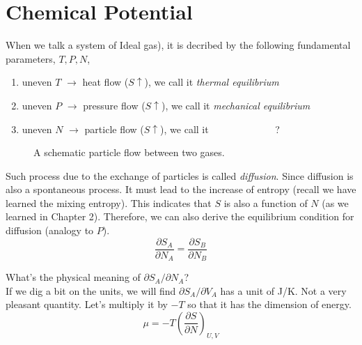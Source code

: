 \documentclass[twoside]{article}
\begin{document}
\section{Chemical Potential}
When we talk a system of Ideal gas), it is decribed by the following fundamental parameters, $T,P,N$,
\begin{enumerate}
\item uneven $T$ $\rightarrow$ heat     flow ($S \uparrow$), we call it {\it thermal equilibrium}
\item uneven $P$ $\rightarrow$ pressure flow ($S \uparrow$), we call it {\it mechanical equilibrium}
\item uneven $N$ $\rightarrow$ particle flow ($S \uparrow$), we call it ~~~~~~~~~~~~~?
\end{enumerate}
\begin{figure}[h]
\centering
{}
\caption{A schematic particle flow between two gases.}
\end{figure}

Such process due to the exchange of particles is called {\it diffusion}. Since diffusion is also a
spontaneous process. It must lead to the increase of entropy (recall we have learned the mixing entropy).
This indicates that $S$ is also a function of $N$ (as we learned in Chapter 2).
Therefore, we can also derive the equilibrium condition for diffusion (analogy to $P$).
\begin{equation} \label{entropy} 
\frac {\partial{S_A}} {\partial{N_A}} =  \frac {\partial{S_B}} {\partial{N_B}} 
\end{equation}

What's the physical meaning of $\partial{S_A}/\partial{N_A}$? \\
If we dig a bit on the units, we will find $\partial{S_A}/\partial{V_A}$ has a unit of J/K. 
Not a very pleasant quantity. Let's multiply it by $-T$ so that it has the dimension of energy.
\begin{equation} \label{entropy} 
\mu = -T (\frac {\partial{S}} {\partial{N}})_{U,V}
\end{equation}
\end{document}
